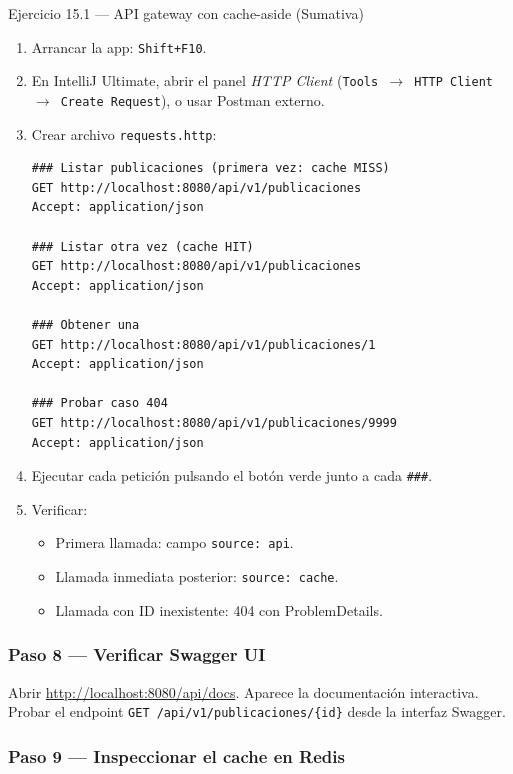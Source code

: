 \begin{cajaejercicio}{Ejercicio 15.1 --- API gateway con cache-aside (Sumativa)}
\begin{enumerate}
\item Arrancar la app: \texttt{Shift+F10}.
\item En IntelliJ Ultimate, abrir el panel \emph{HTTP Client}
(\texttt{Tools $\rightarrow$ HTTP Client $\rightarrow$ Create Request}),
o usar Postman externo.

\item Crear archivo \texttt{requests.http}:
\begin{lstlisting}[style=shell,numbers=none,caption={Ejemplo de Shell},label=lst:15.20]
### Listar publicaciones (primera vez: cache MISS)
GET http://localhost:8080/api/v1/publicaciones
Accept: application/json

### Listar otra vez (cache HIT)
GET http://localhost:8080/api/v1/publicaciones
Accept: application/json

### Obtener una
GET http://localhost:8080/api/v1/publicaciones/1
Accept: application/json

### Probar caso 404
GET http://localhost:8080/api/v1/publicaciones/9999
Accept: application/json
\end{lstlisting}

\item Ejecutar cada petición pulsando el botón verde junto a cada
\texttt{\#\#\#}.

\item Verificar:
\begin{itemize}
\item Primera llamada: campo \texttt{source: api}.
\item Llamada inmediata posterior: \texttt{source: cache}.
\item Llamada con ID inexistente: 404 con ProblemDetails.
\end{itemize}
\end{enumerate}

\subsubsection*{Paso 8 --- Verificar Swagger UI}

Abrir \url{http://localhost:8080/api/docs}. Aparece la documentación
interactiva. Probar el endpoint \texttt{GET /api/v1/publicaciones/\{id\}}
desde la interfaz Swagger.

\subsubsection*{Paso 9 --- Inspeccionar el cache en Redis}


\end{cajaejercicio}
